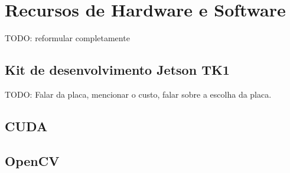 \chapter{Recursos de Hardware e Software}\label{cap:recursos}

TODO: reformular completamente

\section{Kit de desenvolvimento Jetson TK1}

TODO: Falar da placa, mencionar o custo, falar sobre a escolha da placa.

\section{CUDA}



\section{OpenCV}


